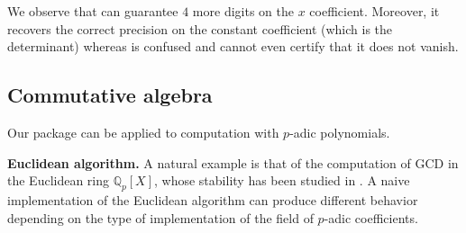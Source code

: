 \documentclass[sigconf]{acmart}
\newcommand{\Q}{\mathbb Q}
\newcommand{\Qp}{\Q_p}
\newcommand{\ZpCR}{\text{\color{output} \rm \tt ZpCR}\xspace}
\newcommand{\ZpLC}{\text{\color{output} \rm \tt ZpLC}\xspace}
\theoremstyle{definition}
\begin{document}
\smallskip

\noindent
We observe that \ZpLC can guarantee $4$ more digits on the $x$ 
coefficient. Moreover, it recovers the correct precision on the
constant coefficient (which is the determinant) whereas \ZpCR is 
confused and cannot even certify that it does not vanish.

\subsection{Commutative algebra}
\label{ssec:comalg}

Our package can be applied to computation with $p$-adic polynomials. 

\medskip

\noindent \textbf{Euclidean algorithm.}
%
A natural example is that of the computation of GCD in the Euclidean 
ring $\Qp[X]$, whose stability has been studied in \cite{caruso:2017}. A 
naive implementation of the Euclidean algorithm can produce different 
behavior depending on the type of implementation of the field of 
$p$-adic coefficients.

\smallskip
\end{document}
